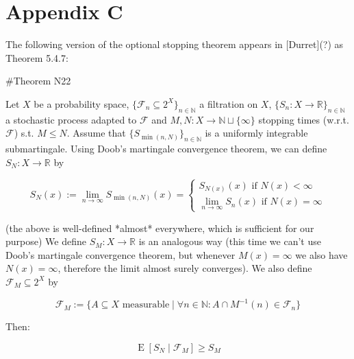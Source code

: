 \documentclass[a4paper]{article}
\DeclareMathOperator{\E}{E}
\newcommand{\Nats}{\mathbb{N}}
\newcommand{\Reals}{\mathbb{R}}
\newcommand{\Sq}[2]{\{#1\}_{#2 \in \Nats}}
\newcommand{\Sqn}[1]{\Sq{#1}{n}}
\newcommand{\F}{\mathcal{F}}
\begin{document}
\section{Appendix C}

The following version of the optional stopping theorem appears in [Durret](?) as Theorem 5.4.7:

\#Theorem N22

Let ${X}$ be a probability space, ${\Sqn{\F_n \subseteq 2^X}}$ a filtration on ${X}$, ${\Sqn{S_n: X \rightarrow \Reals}}$ a stochastic process adapted to ${\F}$ and ${M,N: X \rightarrow \Nats \sqcup \{\infty\}}$ stopping times (w.r.t. ${\F}$) s.t. ${M \leq N}$. Assume that ${\Sqn{S_{\min(n,N)}}}$ is a uniformly integrable submartingale. Using Doob's martingale convergence theorem, we can define ${S_N : X \rightarrow \Reals}$ by

$$S_N(x):=\lim_{n \rightarrow \infty} S_{\min(n,N)}(x)=\begin{cases}S_{N(x)}(x) \text{ if } N(x) < \infty\\\lim_{n \rightarrow \infty} S_n(x) \text{ if } N(x) = \infty\end{cases}$$

(the above is well-defined *almost* everywhere, which is sufficient for our purpose) We define ${S_M: X \rightarrow \Reals}$ is an analogous way (this time we can't use Doob's martingale convergence theorem, but whenever ${M(x) = \infty}$ we also have ${N(x) = \infty}$, therefore the limit almost surely converges). We also define ${\F_M \subseteq 2^X}$ by

$$\F_M:=\{A \subseteq X \text{ measurable} \mid \forall n \in \Nats: A \cap M^{-1}(n) \in \F_n\}$$

Then:

$$\E[S_N \mid \F_M] \geq S_M$$
\end{document}

